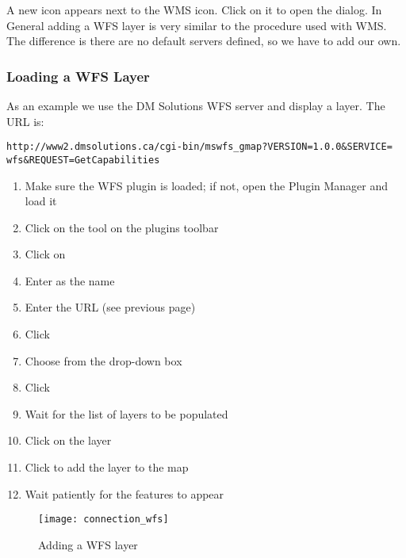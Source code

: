 A new  icon appears next 
to the WMS icon. Click on it to open the dialog. In General adding a WFS 
layer is very similar to the procedure used with WMS. The difference is 
there are no default servers defined, so we have to add our own.

\subsubsection{Loading a WFS Layer}

As an example we use the DM Solutions WFS server and display a layer. The URL is:
\begin{verbatim}
http://www2.dmsolutions.ca/cgi-bin/mswfs_gmap?VERSION=1.0.0&SERVICE=
wfs&REQUEST=GetCapabilities
\end{verbatim}

\begin{enumerate}
  \item Make sure the WFS plugin is loaded; if not, open the Plugin Manager and load it
  \item Click on the 
  tool on the plugins toolbar
  \item Click on  
  \item Enter  as the name
  \item Enter the URL (see previous page)
  \item Click  
  \item Choose  from the drop-down box
  \item Click  
  \item Wait for the list of layers to be populated
  \item Click on the  layer
  \item Click  to add the layer to the map
  \item Wait patiently for the features to appear
\end{enumerate}

\begin{figure}[ht]
  \begin{center}
  	\caption{Adding a WFS layer \nixcaption}\label{fig:wfs_dmsolutions}
	\texttt{[image: connection\_wfs]}
  \end{center}
\end{figure}

